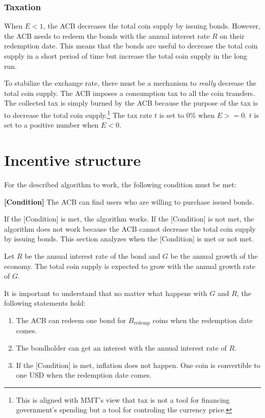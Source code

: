 \documentclass[dvipdfmx,a4paper]{article}
\begin{document}
\subsubsection{Taxation}

When $E<1$, the ACB decreases the total coin supply by issuing bonds. However, the ACB needs to redeem the bonds with the annual interest rate $R$ on their redemption date. This means that the bonds are useful to decrease the total coin supply in a short period of time but increase the total coin supply in the long run.

To stabilize the exchange rate, there must be a mechanism to \textit{really} decrease the total coin supply. The ACB imposes a consumption tax to all the coin transfers. The collected tax is simply burned by the ACB because the purpose of the tax is to decrease the total coin supply.\footnote{This is aligned with MMT's view that tax is not a tool for financing government's spending but a tool for controling the currency price.} The tax rate $t$ is set to 0\% when $E>=0$. $t$ is set to a positive number when $E<0$.

\section{Incentive structure}

For the described algorithm to work, the following condition must be met:

\begin{description}
\item{\textbf{[Condition]}} The ACB can find users who are willing to purchase issued bonds.
\end{description}

If the [Condition] is met, the algorithm works. If the [Condition] is not met, the algorithm does not work because the ACB cannot decrease the total coin supply by issuing bonds. This section analyzes when the [Condition] is met or not met.

Let $R$ be the annual interest rate of the bond and $G$ be the annual growth of the economy. The total coin supply is expected to grow with the annual growth rate of $G$. 

It is important to understand that no matter what happens with $G$ and $R$, the following statements hold:

\begin{enumerate}
\renewcommand{\labelenumi}{(\alph{enumi})}
\item The ACB can redeem one bond for $B_{\mathrm{redemp}}$ coins when the redemption date comes.
\item The bondholder can get an interest with the annual interest rate of $R$.
\item If the [Condition] is met, inflation does not happen. One coin is convertible to one USD when the redemption date comes.
\end{enumerate}
\end{document}

